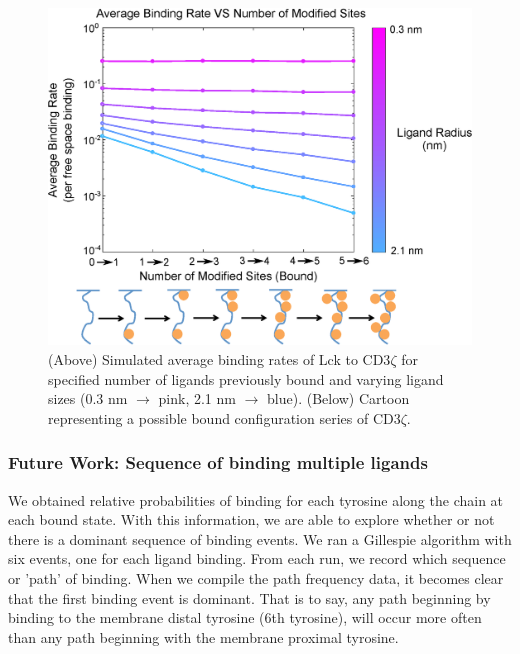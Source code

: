 \documentclass[../../AdvancementSummary.tex]{subfiles}
\begin{document}
\begin{figure}
	\begin{center}
		\includegraphics[width=\linewidth]{ResultsFigures/CD3ZetaMultipleBindingMembraneOn/ibEqual/AvgBindVSTotalModified.eps}
		\caption{(Above) Simulated average binding rates of Lck to CD3$\zeta$ for specified number of ligands previously bound and varying ligand sizes (0.3 nm $\rightarrow$ pink, 2.1 nm $		\rightarrow$ blue). (Below) Cartoon representing a possible bound configuration series of CD3$\zeta$. \label{fig: SimBindMemOnibEqual} }
	\end{center}
\end{figure}


\subsubsection{Future Work: Sequence of binding multiple ligands}

We obtained relative probabilities of binding for each tyrosine along the chain at each bound state. With this information, we are able to explore whether or not there is a dominant sequence of binding events. We ran a Gillespie algorithm with six events, one for each ligand binding. From each run, we record which sequence or 'path' of binding. When we compile the path frequency data, it becomes clear that the first binding event is dominant. That is to say, any path beginning by binding to the membrane distal tyrosine (6th tyrosine), will occur more often than any path beginning with the membrane proximal tyrosine. 
\end{document}
